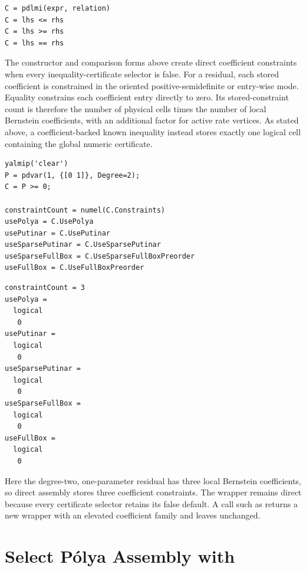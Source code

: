 \syntaxhead
\begin{lstlisting}[style=dpsyntax]
C = pdlmi(expr, relation)
C = lhs <= rhs
C = lhs >= rhs
C = lhs == rhs
\end{lstlisting}

The constructor and comparison forms above create direct coefficient constraints when every inequality-certificate selector is false. For a  residual, each stored coefficient is constrained in the oriented positive-semidefinite or entry-wise mode. Equality constrains each coefficient entry directly to zero. Its stored-constraint count is therefore the number of physical cells times the number of local Bernstein coefficients, with an additional factor for active rate vertices. As stated above, a coefficient-backed known  inequality instead stores exactly one logical cell containing the global numeric certificate.

\examplehead
\begin{lstlisting}[style=dpmatlab]
yalmip('clear')
P = pdvar(1, {[0 1]}, Degree=2);
C = P >= 0;

constraintCount = numel(C.Constraints)
usePolya = C.UsePolya
usePutinar = C.UsePutinar
useSparsePutinar = C.UseSparsePutinar
useSparseFullBox = C.UseSparseFullBoxPreorder
useFullBox = C.UseFullBoxPreorder
\end{lstlisting}

\begin{lstlisting}[style=dpoutput]
constraintCount = 3
usePolya =
  logical
   0
usePutinar =
  logical
   0
useSparsePutinar =
  logical
   0
useSparseFullBox =
  logical
   0
useFullBox =
  logical
   0
\end{lstlisting}

Here the degree-two, one-parameter residual has three local Bernstein coefficients, so direct assembly stores three coefficient constraints. The wrapper remains direct because every certificate selector retains its false default. A call such as  returns a new wrapper with an elevated coefficient family and leaves  unchanged.

\section{Select P\'olya Assembly with \texorpdfstring{}{usePolya}}
\label{sec:pdlmi-polya}


